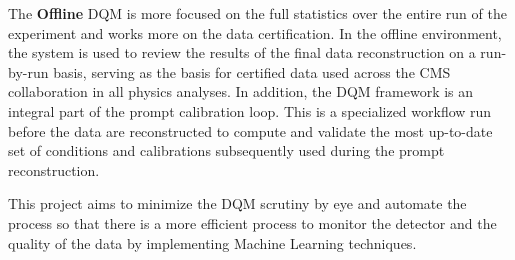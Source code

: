 The \textbf{Offline} DQM is more focused on the full statistics over the entire run of the experiment and works more on the data certification. In the offline environment, the system is used to review the results of the final data reconstruction on a run-by-run basis, serving as the basis for certified data used across the CMS collaboration in all physics analyses. In addition, the DQM framework is an integral part of the prompt calibration loop. This is a specialized workflow run before the data are reconstructed to compute and validate the most up-to-date set of conditions and calibrations subsequently used during the prompt reconstruction.

This project aims to minimize the DQM scrutiny by eye and automate the process so that there is a more efficient process to monitor the detector and the quality of the data by implementing Machine Learning techniques.